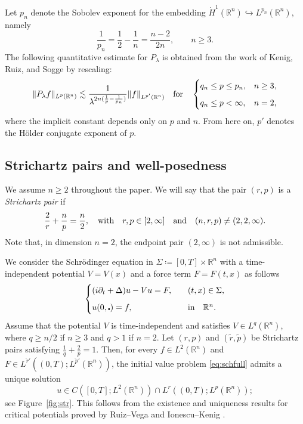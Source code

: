 \documentclass[11pt,a4paper]{amsart}
\theoremstyle{remark}
\theoremstyle{definition}
\newcommand{\R}{\mathbb{R}}
\def\cd{\centerdot}
\begin{document}
Let $p_n$ denote the Sobolev exponent for the embedding $\dot H^1(\R^n)\hookrightarrow L^{p_n}(\R^n)$, namely
\[
\frac{1}{p_n}=\frac12-\frac1n=\frac{n-2}{2n}, \qquad n\geq 3.
\]
The following quantitative estimate for $P_\lambda$ is obtained from the work of Kenig, Ruiz, and Sogge \cite{zbMATH04050093} by rescaling:
\begin{equation}\label{eq:KRS}
\|P_\lambda f\|_{L^p(\R^n)} \lesssim \frac{1}{\lambda^{2n(\frac1p-\frac1{p_n})}} \|f\|_{L^{p'}(\R^n)} \quad\text{for}\quad
\begin{cases} 
q_n\leq p\le p_n, & n\geq3, 
\vspace{.6em}
\\ 
q_n\leq p<\infty, & n=2,
\end{cases}
\end{equation}
where the implicit constant depends only on $p$ and $n$. From here on, $p'$ denotes the H\"older conjugate exponent of $p$.



\subsection{Strichartz pairs and well-posedness}\label{subsec: Stri_WP} We assume $n\geq 2$ throughout the paper. We will say that the pair $(r, p)$ is a \emph{Strichartz pair} if 
\[
\frac{2}{r} + \frac{n}{p} = \frac{n}{2}, \quad \textup{with}\quad r, p \in [2, \infty] \quad  \mathrm{and} \quad (n, r, p) \neq (2, 2, \infty).
\]
Note that, in dimension $n=2$, the endpoint pair $(2,\infty)$ is not admissible.

We consider the Schr\"odinger equation in $\Sigma\coloneqq [0,T]\times \R^n$ with a time-independent potential $V=V(x)$ and a force term $F=F(t,x)$ as follows
\begin{equation}\label{eq:schfull}
\begin{cases}
(i\partial_t +\Delta)u-Vu=F,\quad &(t,x)\in \Sigma,
\vspace{.6em}
\\
u(0,\cd)=f, \quad &\textrm{in}\quad \R^n.
\end{cases}
\end{equation}
Assume that the potential $V$ is time-independent and satisfies $V\in L^q(\R^n)$, where $q\geq n/2$ if $n\ge3$ and $q>1$ if $n=2$. Let $(r,p)$ and $(\tilde r,\tilde p)$ be Strichartz pairs satisfying $\frac{1}{q}+\frac{2}{p}=1$. Then, for every $f\in L^2(\R^n)$ and $F\in L^{\tilde r'}((0,T);L^{\tilde p'}(\R^n))$, the initial value problem \eqref{eq:schfull} admits a unique solution
\[
u\in C\left([0,T];L^2(\R^n)\right)\cap L^r\left((0,T);L^p(\R^n)\right);
\]
see Figure~\ref{fig:str}. This follows from the existence and uniqueness results for critical potentials proved by Ruiz--Vega \cite{zbMATH00179225} and Ionescu--Kenig \cite{zbMATH02204588}.
\end{document}
